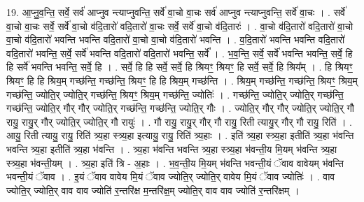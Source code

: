 \documentclass[17pt]{extarticle}
\begin{document}
19. आ॒प्नु॒व॒न्ति॒ सर्वे॒ सर्व॑ आप्नुव न्त्याप्नुवन्ति॒ सर्वे॑ वा॒चो वा॒चः सर्व॑ आप्नुव न्त्याप्नुवन्ति॒ सर्वे॑ वा॒चः । . सर्वे॑ वा॒चो वा॒चः सर्वे॒ सर्वे॑ वा॒चो व॑दि॒तारो॑ वदि॒तारो॑ वा॒चः सर्वे॒ सर्वे॑ वा॒चो व॑दि॒तारः॑ । . वा॒चो व॑दि॒तारो॑ वदि॒तारो॑ वा॒चो वा॒चो व॑दि॒तारो॑ भवन्ति भवन्ति वदि॒तारो॑ वा॒चो वा॒चो व॑दि॒तारो॑ भवन्ति । . व॒दि॒तारो॑ भवन्ति भवन्ति वदि॒तारो॑ वदि॒तारो॑ भवन्ति॒ सर्वे॒ सर्वे॑ भवन्ति वदि॒तारो॑ वदि॒तारो॑ भवन्ति॒ सर्वे᳚ । . भ॒व॒न्ति॒ सर्वे॒ सर्वे॑ भवन्ति भवन्ति॒ सर्वे॒ हि हि सर्वे॑ भवन्ति भवन्ति॒ सर्वे॒ हि । . सर्वे॒ हि हि सर्वे॒ सर्वे॒ हि श्रियꣳ॒॒ श्रियꣳ॒॒ हि सर्वे॒ सर्वे॒ हि श्रिय᳚म् । . हि श्रियꣳ॒॒ श्रियꣳ॒॒ हि हि श्रिय॒म् गच्छ॑न्ति॒ गच्छ॑न्ति॒ श्रियꣳ॒॒ हि हि श्रिय॒म् गच्छ॑न्ति । . श्रिय॒म् गच्छ॑न्ति॒ गच्छ॑न्ति॒ श्रियꣳ॒॒ श्रिय॒म् गच्छ॑न्ति॒ ज्योति॒र् ज्योति॒र् गच्छ॑न्ति॒ श्रियꣳ॒॒ श्रिय॒म् गच्छ॑न्ति॒ ज्योतिः॑ । . गच्छ॑न्ति॒ ज्योति॒र् ज्योति॒र् गच्छ॑न्ति॒ गच्छ॑न्ति॒ ज्योति॒र् गौर् गौर् ज्योति॒र् गच्छ॑न्ति॒ गच्छ॑न्ति॒ ज्योति॒र् गौः । . ज्योति॒र् गौर् गौर् ज्योति॒र् ज्योति॒र् गौ रायु॒ रायु॒र् गौर् ज्योति॒र् ज्योति॒र् गौ रायुः॑ । . गौ रायु॒ रायु॒र् गौर् गौ रायु॒ रिती त्यायु॒र् गौर् गौ रायु॒ रिति॑ । . आयु॒ रिती त्यायु॒ रायु॒ रिति॑ त्र्य॒हा स्त्र्य॒हा इत्यायु॒ रायु॒ रिति॑ त्र्य॒हाः । . इति॑ त्र्य॒हा स्त्र्य॒हा इतीति॑ त्र्य॒हा भ॑वन्ति भवन्ति त्र्य॒हा इतीति॑ त्र्य॒हा भ॑वन्ति । . त्र्य॒हा भ॑वन्ति भवन्ति त्र्य॒हा स्त्र्य॒हा भ॑वन्ती॒य मि॒यम् भ॑वन्ति त्र्य॒हा स्त्र्य॒हा भ॑वन्ती॒यम् । . त्र्य॒हा इति॑ त्रि - अ॒हाः । . भ॒व॒न्ती॒य मि॒यम् भ॑वन्ति भवन्ती॒यं ॅवाव वावेयम् भ॑वन्ति भवन्ती॒यं ॅवाव । . इ॒यं ॅवाव वावेय मि॒यं ॅवाव ज्योति॒र् ज्योति॒र् वावेय मि॒यं ॅवाव ज्योतिः॑ । . वाव ज्योति॒र् ज्योति॒र् वाव वाव ज्योति॑ र॒न्तरि॑क्ष म॒न्तरि॑क्ष॒म् ज्योति॒र् वाव वाव ज्योति॑ र॒न्तरि॑क्षम् । \newline
\end{document}
